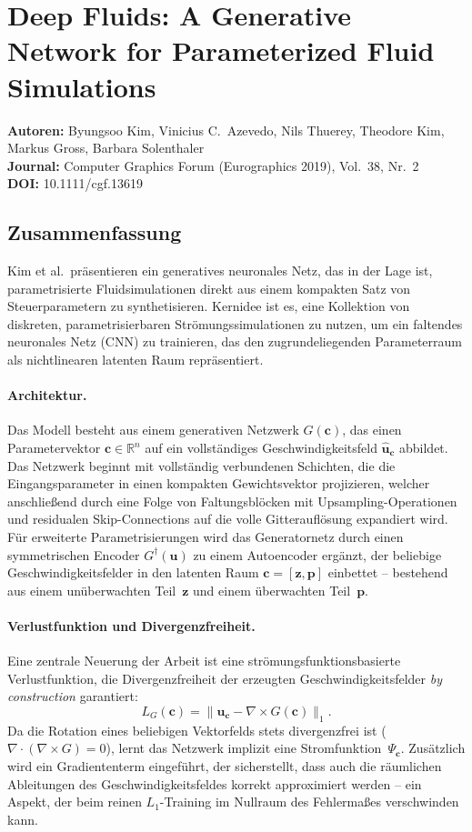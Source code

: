 \documentclass[a4paper,12pt]{article}
\begin{document}
\section*{Deep Fluids: A Generative Network for Parameterized Fluid Simulations}

\textbf{Autoren:} Byungsoo Kim, Vinicius C.\ Azevedo, Nils Thuerey, Theodore Kim,
Markus Gross, Barbara Solenthaler \\
\textbf{Journal:} Computer Graphics Forum (Eurographics 2019), Vol.~38, Nr.~2 \\
\textbf{DOI:} 10.1111/cgf.13619

\subsection*{Zusammenfassung}

Kim et al.\ präsentieren ein generatives neuronales Netz, das in der Lage ist,
parametrisierte Fluidsimulationen direkt aus einem kompakten Satz von Steuerparametern
zu synthetisieren. Kernidee ist es, eine Kollektion von diskreten, parametrisierbaren
Strömungssimulationen zu nutzen, um ein faltendes neuronales Netz (CNN) zu trainieren,
das den zugrundeliegenden Parameterraum als nichtlinearen latenten Raum repräsentiert.

\paragraph{Architektur.}
Das Modell besteht aus einem generativen Netzwerk $G(\mathbf{c})$, das einen
Parametervektor $\mathbf{c} \in \mathbb{R}^n$ auf ein vollständiges Geschwindigkeitsfeld
$\hat{\mathbf{u}}_\mathbf{c}$ abbildet. Das Netzwerk beginnt mit vollständig verbundenen
Schichten, die die Eingangsparameter in einen kompakten Gewichtsvektor projizieren,
welcher anschließend durch eine Folge von Faltungsblöcken mit Upsampling-Operationen
und residualen Skip-Connections auf die volle Gitterauflösung expandiert wird. Für
erweiterte Parametrisierungen wird das Generatornetz durch einen symmetrischen
Encoder $G^\dagger(\mathbf{u})$ zu einem Autoencoder ergänzt, der beliebige
Geschwindigkeitsfelder in den latenten Raum $\mathbf{c} = [\mathbf{z}, \mathbf{p}]$
einbettet -- bestehend aus einem unüberwachten Teil~$\mathbf{z}$ und einem überwachten
Teil~$\mathbf{p}$.

\paragraph{Verlustfunktion und Divergenzfreiheit.}
Eine zentrale Neuerung der Arbeit ist eine strömungsfunktionsbasierte Verlustfunktion,
die Divergenzfreiheit der erzeugten Geschwindigkeitsfelder \emph{by construction}
garantiert:
\[
  L_G(\mathbf{c}) = \|\mathbf{u}_\mathbf{c} - \nabla \times G(\mathbf{c})\|_1.
\]
Da die Rotation eines beliebigen Vektorfelds stets divergenzfrei ist
($\nabla \cdot (\nabla \times G) = 0$), lernt das Netzwerk implizit eine
Stromfunktion~$\Psi_\mathbf{c}$. Zusätzlich wird ein Gradiententerm eingeführt,
der sicherstellt, dass auch die räumlichen Ableitungen des Geschwindigkeitsfeldes
korrekt approximiert werden -- ein Aspekt, der beim reinen $L_1$-Training im Nullraum
des Fehlermaßes verschwinden kann.
\end{document}
